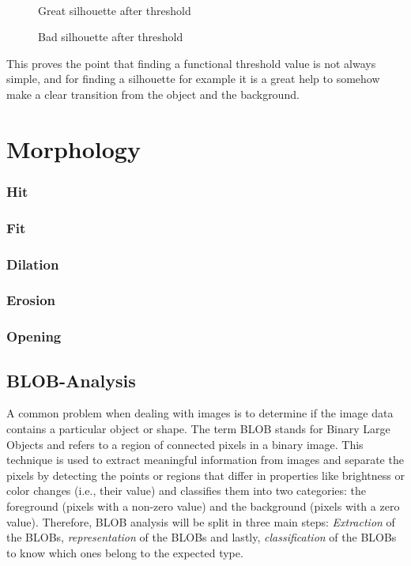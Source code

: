 \begin{figure}[htbp]
\begin{minipage}[b]{0.45\textwidth}
\end{minipage} \\ %
\begin{minipage}[t]{0.45\textwidth}
\caption{Great silhouette after threshold} %
\label{fig:SimpleThresholdAfter}
\end{minipage} \hfill
\begin{minipage}[t]{0.45\textwidth}
\caption{Bad silhouette after threshold} %
\label{fig:ComplicatedThresholdAfter}
\end{minipage}
\end{figure}
 
This proves the point that finding a functional threshold value is not always simple, and for finding a silhouette for example it is a great help to somehow make a clear transition from the object and the background.

\section{Morphology}
\subsubsection{Hit}
\subsubsection{Fit}
\subsubsection{Dilation}
\subsubsection{Erosion}
\subsubsection{Opening}
\subsection{BLOB-Analysis}
A common problem when dealing with images is to determine if the image data contains a particular object or shape. The term BLOB stands for Binary Large Objects and refers to a region of connected pixels in a binary image. This technique is used to extract meaningful information from images and separate the pixels by detecting the points or regions that differ in properties like brightness or color changes (i.e., their value) and classifies them into two categories: the foreground (pixels with a non-zero value) and the background (pixels with a zero value).
Therefore, BLOB analysis will be split in three main steps: \textit{Extraction} of the BLOBs, \textit{representation} of the BLOBs and lastly, \textit{classification} of the BLOBs to know which ones belong to the expected type.
